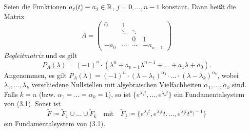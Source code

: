 \documentclass{cheat-sheet}
\begin{document}
\begin{bem}
  Seien die Funktionen $a_j(t) \equiv a_j \in \mathbb{R}$, $j = 0, ..., n-1$ konstant. Dann heißt die Matrix
  \[
    A = \begin{pmatrix}
      0 & 1 && \\
      & \ddots & \ddots & \\
      && 0 & 1\\
      - a_0 & \cdots & \cdots & -a_{n-1}
    \end{pmatrix}
  \]
  \emph{Begleitmatrix} und es gilt
  \[ P_A(\lambda) = (-1)^n \cdot (\lambda^n + a_{n-1} \lambda^{n-1} + ... + a_1 \lambda + a_0). \]
  Angenommen, es gilt $P_A(\lambda) = (-1)^n \cdot (\lambda - \lambda_1)^{\alpha_1} \cdot ... \cdot (\lambda - \lambda_k)^{\alpha_k}$, wobei $\lambda_1, ..., \lambda_k$ verschiedene Nullstellen mit algebraischen Vielfachheiten $\alpha_1, ..., \alpha_k$ sind.
  Falls $k = n$ (bzw. $\alpha_1 = ... = \alpha_k = 1$), so ist $\{ e^{\lambda_1 t}, ..., e^{\lambda_k t} \}$ ein Fundamentalsystem von (3.1). Sonst ist
  \[
    \tilde{F} \coloneqq \tilde{F}_1 \cup ... \cup \tilde{F}_k
    \quad \text{mit} \quad
    \tilde{F}_j \coloneqq \{ e^{\lambda_j t}, e^{\lambda_j t} t, ..., e^{\lambda_j t} t^{\alpha_j - 1} \}
  \]
  ein Fundamentalsystem von (3.1).
\end{bem}

\end{document}
